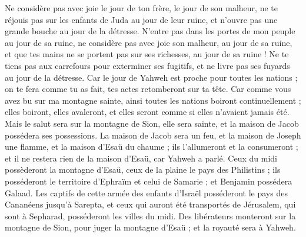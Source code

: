 \begin{multicols}{2}
Ne considère pas avec joie le jour de ton frère, le jour de son malheur, ne te réjouis pas sur les enfants de Juda au jour de leur ruine, et n’ouvre pas une grande bouche au jour de la détresse.
N’entre pas dans les portes de mon peuple au jour de sa ruine, ne considère pas avec joie son malheur, au jour de sa ruine, et que tes mains ne se portent pas sur ses richesses, au jour de sa ruine !
Ne te tiens pas aux carrefours pour exterminer ses fugitifs, et ne livre pas ses fuyards au jour de la détresse.
Car le jour de Yahweh est proche pour toutes les nations ; on te fera comme tu as fait, tes actes retomberont sur ta tête.
Car comme vous avez bu sur ma montagne sainte, ainsi toutes les nations boiront continuellement ; elles boiront, elles avaleront, et elles seront comme si elles n'avaient jamais été.
Mais le salut sera sur la montagne de Sion, elle sera sainte, et la maison de Jacob possédera ses possessions.
La maison de Jacob sera un feu, et la maison de Joseph une flamme, et la maison d'Esaü du chaume ; ils l'allumeront et la consumeront ; et il ne restera rien de la maison d'Esaü, car Yahweh a parlé.
Ceux du midi possèderont la montagne d'Esaü, ceux de la plaine le pays des Philistins ; ils posséderont le territoire d'Ephraïm et celui de Samarie ; et Benjamin possédera Galaad.
Les captifs de cette armée des enfants d'Israël posséderont le pays des Cananéens jusqu'à Sarepta, et ceux qui auront été transportés de Jérusalem, qui sont à Sepharad, posséderont les villes du midi.
Des libérateurs monteront sur la montagne de Sion, pour juger la montagne d'Esaü ; et la royauté sera à Yahweh.
\PPE{}
\end{multicols}
